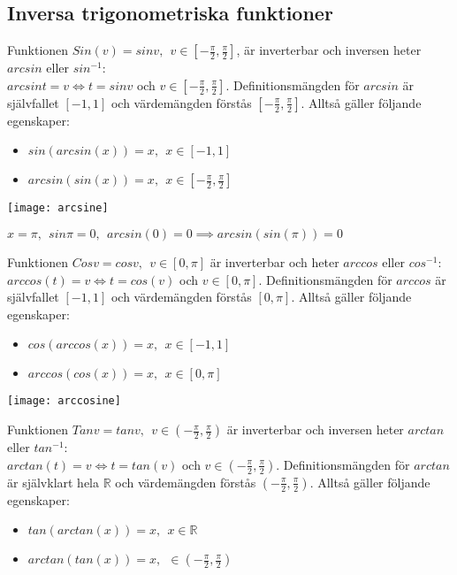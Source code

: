 \documentclass{report}
\begin{document}
\pagebreak
\subsection{Inversa trigonometriska funktioner}
Funktionen $ Sin(v) = sinv,\:\: v \in [- \frac{\pi}{2}, \frac{\pi}{2} ] $, är inverterbar och inversen heter $ arcsin $ eller $ sin^{-1} $:\\ $ arcsint = v \iff t = sinv $ och $ v \in [ - \frac{\pi}{2} , \frac{\pi}{2}  ]$. Definitionsmängden för $ arcsin $ är självfallet $ [-1,1] $ och värdemängden förstås $ [- \frac{\pi}{2}, \frac{\pi}{2} ] $. Alltså gäller följande egenskaper:
\begin{itemize}
	\item $ sin(arcsin(x)) = x,\:\: x \in [-1,1] $
	\item $ arcsin(sin(x)) = x, \:\: x \in [- \frac{\pi}{2}, \frac{\pi}{2} ] $ 
\end{itemize}
\begin{center}
\texttt{[image: arcsine]}
\end{center}

\ex{}
{
$ x = \pi,\:\: sin \pi = 0,\:\:arcsin(0) = 0 \implies arcsin(sin(\pi)) = 0 $ 
}

\vspace{20pt}
\noindent
Funktionen $ Cosv = cosv,\:\:v \in [0, \pi] $ är inverterbar och heter $ arccos $ eller $ cos^{-1} $:\\
$arccos(t) = v \iff t = cos(v)$ och $ v \in [0, \pi] $. Definitionsmängden för $ arccos $ är självfallet $ [-1,1] $ och värdemängden förstås $ [0, \pi] $. Alltså gäller följande egenskaper: 
\begin{itemize}
	\item $ cos(arccos(x)) = x,\:\: x \in [-1,1] $
	\item $ arccos(cos(x)) = x, \:\:x \in [0, \pi] $ 
\end{itemize}


\begin{center}
\texttt{[image: arccosine]}
\end{center}

\pagebreak
\noindent
Funktionen $ Tanv = tanv,\:\: v \in (- \frac{\pi}{2}, \frac{\pi}{2} ) $ är inverterbar och inversen heter $ arctan $ eller $ tan^{-1} $:\\
$ arctan(t) = v \iff t = tan(v) $ och $ v \in (- \frac{\pi}{2}, \frac{\pi}{2} ) $. Definitionsmängden för $ arctan $ är självklart hela $ \mathbb{R} $ och värdemängden förstås $ (- \frac{\pi}{2}, \frac{\pi}{2} )$. Alltså gäller följande egenskaper:
\begin{itemize}
	\item $ tan(arctan(x)) = x, \:\: x \in \mathbb{R} $
	\item $ arctan(tan(x)) = x, \:\: \in (- \frac{\pi}{2}, \frac{\pi}{2} ) $ 
\end{itemize}
\end{document}
